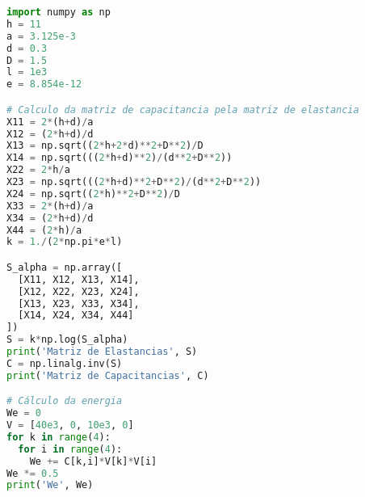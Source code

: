 \documentclass{aleph-revista}
\begin{document}
\begin{lstlisting}[language=Python, caption=Código usado para cálculo da matriz de capacitâncias e energia, label=lst:1]
import numpy as np
h = 11
a = 3.125e-3
d = 0.3
D = 1.5
l = 1e3
e = 8.854e-12

# Calculo da matriz de capacitancia pela matriz de elastancia
X11 = 2*(h+d)/a
X12 = (2*h+d)/d
X13 = np.sqrt((2*h+2*d)**2+D**2)/D
X14 = np.sqrt(((2*h+d)**2)/(d**2+D**2))
X22 = 2*h/a
X23 = np.sqrt(((2*h+d)**2+D**2)/(d**2+D**2))
X24 = np.sqrt((2*h)**2+D**2)/D
X33 = 2*(h+d)/a
X34 = (2*h+d)/d
X44 = (2*h)/a
k = 1./(2*np.pi*e*l)

S_alpha = np.array([
  [X11, X12, X13, X14], 
  [X12, X22, X23, X24],
  [X13, X23, X33, X34],
  [X14, X24, X34, X44]
])
S = k*np.log(S_alpha)
print('Matriz de Elastancias', S)
C = np.linalg.inv(S)
print('Matriz de Capacitancias', C)

# Cálculo da energia
We = 0
V = [40e3, 0, 10e3, 0]
for k in range(4):
  for i in range(4):
    We += C[k,i]*V[k]*V[i]
We *= 0.5
print('We', We)
\end{lstlisting}
\end{document}
